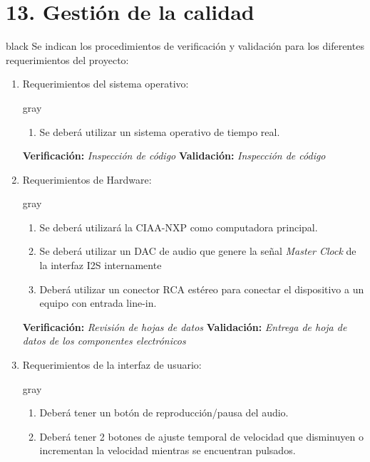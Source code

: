 \documentclass[11pt]{charter}
\begin{document}
\section{13. Gestión de la calidad}
\label{sec:calidad}

\begin{consigna}{black}
Se indican los procedimientos de verificación y validación para los diferentes requerimientos del proyecto:
\begin{enumerate}
\item Requerimientos del sistema operativo:
	\begin{consigna}{gray}
	\begin{enumerate}
	\item  Se deberá utilizar un sistema operativo de tiempo real.
	\end{enumerate}
	\end{consigna}
	\textbf{Verificación:} \textit{Inspección de código} \newline                                                                              
	\newline 
	\textbf{Validación:} \textit{Inspección de código}
\item Requerimientos de Hardware:
	\begin{consigna}{gray}
	\begin{enumerate}
	\item Se deberá utilizará la CIAA-NXP como computadora principal.
	\item Se deberá utilizar un DAC de audio  que genere la señal \textit{Master Clock} de la interfaz I2S internamente 
	\item Deberá utilizar un conector RCA estéreo para conectar el dispositivo a un equipo con entrada  line-in.
	\end{enumerate}
	\end{consigna}
	\textbf{Verificación:} \textit{Revisión de hojas de datos} \newline                                                                              
	\newline 
	\textbf{Validación:} \textit{Entrega de hoja de datos de los componentes electrónicos}
\item Requerimientos de la interfaz de usuario:
	\begin{consigna}{gray}
	\begin{enumerate}
	\item Deberá tener un botón de reproducción/pausa del audio.
	\item Deberá tener 2 botones de ajuste temporal de velocidad que disminuyen o incrementan la velocidad mientras se encuentran pulsados.

\end{enumerate}
\end{consigna}
\end{enumerate}
\end{consigna}
\end{document}
